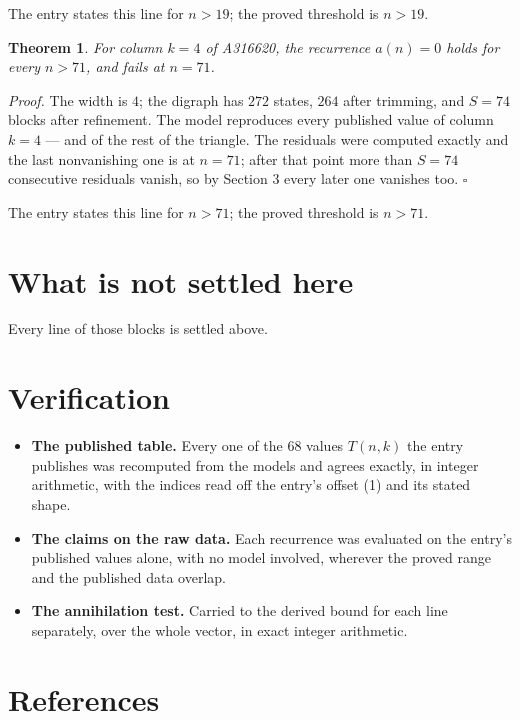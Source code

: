 \documentclass[11pt]{article}
\newtheorem{theorem}{Theorem}
\theoremstyle{definition}
\begin{document}
The entry states this line for $n > 19$; the proved threshold is $n > 19$.

\begin{theorem} For column $k = 4$ of A316620, the recurrence $a(n) = 0$ holds for every $n > 71$, and fails at $n = 71$.\end{theorem}

{\itshape Proof.} The width is $4$; the digraph has $272$ states, $264$ after trimming, and $S = 74$ blocks after refinement. The model reproduces every published value of column $k = 4$ --- and of the rest of the triangle. The residuals were computed exactly and the last nonvanishing one is at $n = 71$; after that point more than $S = 74$ consecutive residuals vanish, so by Section 3 every later one vanishes too. $\square$

The entry states this line for $n > 71$; the proved threshold is $n > 71$.

\section{What is not settled here}

Every line of those blocks is settled above.

\section{Verification}

\begin{itemize}

\item {\bfseries The published table.} Every one of the 68 values $T(n,k)$ the entry publishes was recomputed from the models and agrees exactly, in integer arithmetic, with the indices read off the entry's offset (1) and its stated shape.

\item {\bfseries The claims on the raw data.} Each recurrence was evaluated on the entry's published values alone, with no model involved, wherever the proved range and the published data overlap.

\item {\bfseries The annihilation test.} Carried to the derived bound for each line separately, over the whole vector, in exact integer arithmetic.

\end{itemize}

\section{References}
\end{document}
